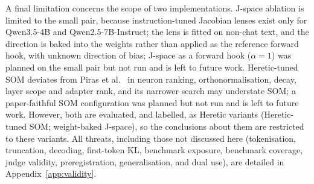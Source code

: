 A final limitation concerns the scope of two implementations. J-space
ablation is limited to the small pair, because instruction-tuned Jacobian
lenses exist only for Qwen3.5-4B and Qwen2.5-7B-Instruct; the lens is fitted on
non-chat text, and the direction is baked into the weights rather than applied
as the reference forward hook, with unknown direction of bias; J-space as a
forward hook ($\alpha=1$) was planned on the small pair but not run and is
left to future work.
Heretic-tuned SOM deviates from Piras et al.~\cite{piras2025som} in neuron
ranking, orthonormalisation, decay, layer scope and adapter rank, and its
narrower search may understate SOM; a paper-faithful SOM configuration was
planned but not run and is left to future work.
However, both are evaluated, and labelled, as Heretic variants
(Heretic-tuned SOM; weight-baked J-space), so the conclusions about them are
restricted to these variants.
All threats,
including those not discussed here (tokenisation, truncation, decoding,
first-token KL, benchmark exposure,
benchmark coverage, judge validity, preregistration, generalisation, and dual
use), are detailed in Appendix~\ref{app:validity}.
